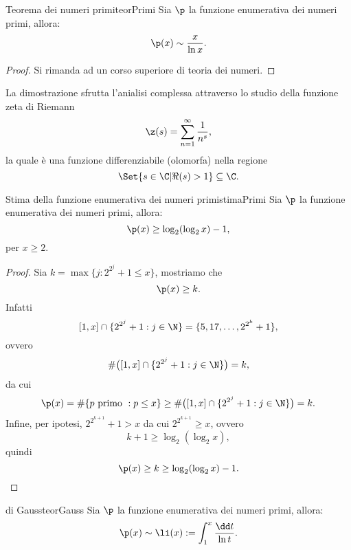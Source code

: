 \begin{teor}{Teorema dei numeri primi}{teorPrimi}
	Sia \(\p\) la funzione enumerativa dei numeri primi, allora:
	\[
		\p(x)\sim\frac{x}{\ln x}.
	\]
\end{teor}

\begin{proof}
	Si rimanda ad un corso superiore di teoria dei numeri.
\end{proof}

\begin{oss}
	La dimostrazione sfrutta l'anialisi complessa attraverso lo studio della funzione zeta di Riemann
	\[
		\z(s)=\sum_{n=1}^{\infty}\frac{1}{n^s},
	\]
	la quale è una funzione differenziabile (olomorfa) nella regione
	\[
		\Set{s\in\C | \Re(s)>1}\subseteq\C.
	\]
\end{oss}

\begin{prop}{Stima della funzione enumerativa dei numeri primi}{stimaPrimi}
	Sia \(\p\) la funzione enumerativa dei numeri primi, allora:
	\[
		\p(x)\ge\log_2(\log_2 x)-1,
	\]
	per \(x\ge 2\).
\end{prop}

\begin{proof}
	Sia \(k=\max\{j:2^{2^j}+1\le x\}\), mostriamo che
	\[
		\p(x)\ge k.
	\]
	Infatti
	\[
		[1,x]\cap\{2^{2^j}+1:j\in\N\}=\{5,17,\dots,2^{2^k}+1\},
	\]
	ovvero
	\[
		\#\big([1,x]\cap\{2^{2^j}+1:j\in\N\}\big)=k,
	\]
	da cui
	\[
		\p(x)=\#\{p\text{ primo }:p\le x\}\ge\#\big([1,x]\cap\{2^{2^j}+1:j\in\N\}\big)=k.
	\]
	Infine, per ipotesi, \(2^{2^{k+1}}+1>x\) da cui \(2^{2^{k+1}}\ge x\), ovvero
	\[
		k+1\ge \log_2(\log_2 x),
	\]
	quindi
	\[
		\p(x)\ge k\ge \log_2(\log_2 x)-1.\qedhere
	\]
\end{proof}
%
%
\begin{teor}{di Gauss}{teorGauss}
	Sia \(\p\) la funzione enumerativa dei numeri primi, allora:
	\[
		\p(x)\sim\li(x):=\int_1^x\frac{\dd t}{\ln t}.
	\]
\end{teor}

